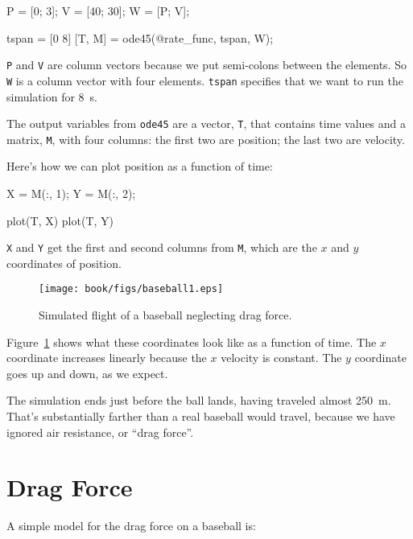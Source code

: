 \begin{code}
    P = [0; 3];       %
    V = [40; 30];     %
    W = [P; V];       %
    
    tspan = [0 8]
    [T, M] = ode45(@rate_func, tspan, W);
\end{code}

{\tt P} and {\tt V} are column vectors because we put semi-colons between the elements.  
So {\tt W} is a column vector with four elements.
{\tt tspan} specifies that we want to run the simulation for \SI{8}{\second}.


The output variables from {\tt ode45} are a vector, 
{\tt T}, that contains time values and a matrix, {\tt M}, with four columns: the first two are position; the last two are velocity.

Here's how we can plot position as a function of time:

\begin{code}
	X = M(:, 1);
    Y = M(:, 2);
    
    plot(T, X)
    plot(T, Y)
\end{code}

{\tt X} and {\tt Y} get the first and second columns from {\tt M}, which are the $x$ and $y$ coordinates of position.

\begin{figure}[ht]
\centerline{\texttt{[image: book/figs/baseball1.eps]}}
\caption{Simulated flight of a baseball neglecting drag force.}
\label{fig:baseball1}
\end{figure}

Figure~\ref{fig:baseball1} shows what these coordinates look like as a function of time.  The $x$ coordinate increases linearly because the $x$ velocity is constant.  The $y$ coordinate goes up and down, as we expect.

The simulation ends just before the ball lands, having traveled almost \SI{250}{\meter}.  That's substantially farther than a real baseball would travel, because we have ignored air resistance, or ``drag force''.


\section{Drag Force}
\label{drag}


A simple model for the drag force on a baseball is:

